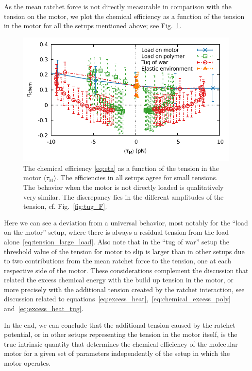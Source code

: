 \documentclass[aps,pre,twocolumn,showpacs,showkeys,superscriptaddress,floatfix]{revtex4-1}
\begin{document}
As the mean ratchet force is not directly measurable in comparison with the tension on the motor,
we plot the chemical efficiency as a function of the tension in the motor for all the setups mentioned above;
see Fig.~\ref{fig:tension_efficiency}. 
\begin{figure}[t]
\centering
\includegraphics[width=.9\linewidth,height=!]{tension_eta.pdf}
\caption{\label{fig:tension_efficiency}
The chemical efficiency \eqref{eq:eta} as a function of the tension in the motor $\langle \tau_\text{M} \rangle$.
The efficiencies in all setups agree for small tensions.
The behavior when the motor is not directly loaded is qualitatively very similar.
The discrepancy lies in the different amplitudes of the tension, cf. Fig.~\ref{fig:tug_F}. 
}
\end{figure}
Here we can see a deviation from a universal behavior, 
most notably for the ``load on the motor'' setup, where there is always a residual tension from the load alone~\eqref{eq:tension_large_load}.
Also note that in the ``tug of war'' setup the threshold value of the tension for motor to slip is larger than in other setups due to two contributions from the mean ratchet force to the tension, one at each respective side of the motor.
These considerations complement the discussion that related the excess chemical energy with the build up tension in the motor, 
or more precisely with the additional tension created by the ratchet interaction, see discussion related to equations~\eqref{eq:excess_heat},~\eqref{eq:chemical_excess_poly} and~\eqref{eq:excess_heat_tug}. 

In the end, we can conclude that the additional tension caused by the ratchet potential, or in other setups representing the tension in the motor itself, 
is the true intrinsic quantity that determines the chemical efficiency of the molecular motor for a given set of parameters independently of the setup in which the motor operates.
\end{document}

